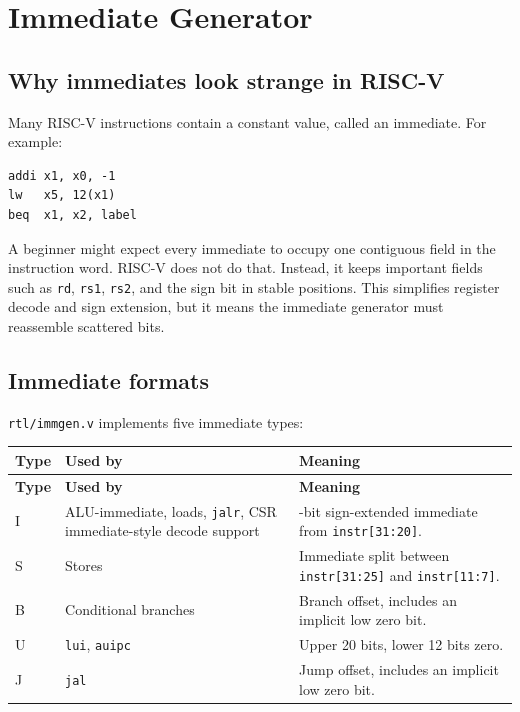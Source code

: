 \section{Immediate Generator}

\subsection{Why immediates look strange in RISC-V}

Many RISC-V instructions contain a constant value, called an immediate. For example:

\begin{lstlisting}[language={}]
addi x1, x0, -1
lw   x5, 12(x1)
beq  x1, x2, label
\end{lstlisting}

A beginner might expect every immediate to occupy one contiguous field in the instruction word. RISC-V does not do that. Instead, it keeps important fields such as \texttt{rd}, \texttt{rs1}, \texttt{rs2}, and the sign bit in stable positions. This simplifies register decode and sign extension, but it means the immediate generator must reassemble scattered bits.

\subsection{Immediate formats}

\texttt{rtl/immgen.v} implements five immediate types:

\begin{longtable}{|>{\RaggedRight\arraybackslash}p{}|>{\RaggedRight\arraybackslash}p{}|>{\RaggedRight\arraybackslash}p{}|}
\hline
\textbf{Type} & \textbf{Used by} & \textbf{Meaning} \\
\hline
\endfirsthead
\hline
\textbf{Type} & \textbf{Used by} & \textbf{Meaning} \\
\hline
\endhead
I & ALU-immediate, loads, \texttt{jalr}, CSR immediate-style decode support & 12-bit sign-extended immediate from \texttt{instr[31:20]}. \\
\hline
S & Stores & Immediate split between \texttt{instr[31:25]} and \texttt{instr[11:7]}. \\
\hline
B & Conditional branches & Branch offset, includes an implicit low zero bit. \\
\hline
U & \texttt{lui}, \texttt{auipc} & Upper 20 bits, lower 12 bits zero. \\
\hline
J & \texttt{jal} & Jump offset, includes an implicit low zero bit. \\
\hline
\end{longtable}

